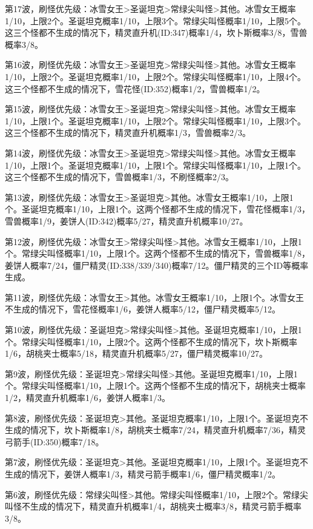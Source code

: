 第17波，刷怪优先级：冰雪女王>圣诞坦克>常绿尖叫怪>其他。冰雪女王概率1/10，上限2个。圣诞坦克概率1/10，上限3个。常绿尖叫怪概率1/10，上限5个。这三个怪都不生成的情况下，精灵直升机(ID:347)概率1/4，坎卜斯概率3/8，雪兽概率3/8。

第16波，刷怪优先级：冰雪女王>圣诞坦克>常绿尖叫怪>其他。冰雪女王概率1/10，上限2个。圣诞坦克概率1/10，上限2个。常绿尖叫怪概率1/10，上限4个。这三个怪都不生成的情况下，雪花怪(ID:352)概率1/2，雪兽概率1/2。

第15波，刷怪优先级：冰雪女王>圣诞坦克>常绿尖叫怪>其他。冰雪女王概率1/10，上限1个。圣诞坦克概率1/10，上限2个。常绿尖叫怪概率1/10，上限3个。这三个怪都不生成的情况下，精灵直升机概率1/3，雪兽概率2/3。

第14波，刷怪优先级：冰雪女王>圣诞坦克>常绿尖叫怪>其他。冰雪女王概率1/10，上限1个。圣诞坦克概率1/10，上限1个。常绿尖叫怪概率1/10，上限1个。这三个怪都不生成的情况下，雪兽概率1/3，不刷怪概率2/3。

第13波，刷怪优先级：冰雪女王>圣诞坦克>其他。冰雪女王概率1/10，上限1个。圣诞坦克概率1/10，上限1个。这两个怪都不生成的情况下，雪花怪概率1/3，雪兽概率1/9，姜饼人(ID:342)概率5/27，精灵直升机概率10/27。

第12波，刷怪优先级：冰雪女王>常绿尖叫怪>其他。冰雪女王概率1/10，上限1个。常绿尖叫怪概率1/10，上限1个。这两个怪都不生成的情况下，雪兽概率1/8，姜饼人概率7/24，僵尸精灵(ID:338/339/340)概率7/12。僵尸精灵的三个ID等概率生成。

第11波，刷怪优先级：冰雪女王>其他。冰雪女王概率1/10，上限1个。冰雪女王不生成的情况下，雪花怪概率1/6，姜饼人概率5/12，僵尸精灵概率5/12。

第10波，刷怪优先级：圣诞坦克>常绿尖叫怪>其他。圣诞坦克概率1/10，上限1个。常绿尖叫怪概率1/10，上限2个。这两个怪都不生成的情况下，坎卜斯概率1/6，胡桃夹士概率5/18，精灵直升机概率5/27，僵尸精灵概率10/27。

第9波，刷怪优先级：圣诞坦克>常绿尖叫怪>其他。圣诞坦克概率1/10，上限1个。常绿尖叫怪概率1/10，上限1个。这两个怪都不生成的情况下，胡桃夹士概率1/2，精灵直升机概率1/6，姜饼人概率1/3。

第8波，刷怪优先级：圣诞坦克>其他。圣诞坦克概率1/10，上限1个。圣诞坦克不生成的情况下，坎卜斯概率1/8，胡桃夹士概率7/24，精灵直升机概率7/36，精灵弓箭手(ID:350)概率7/18。

第7波，刷怪优先级：圣诞坦克>其他。圣诞坦克概率1/10，上限1个。圣诞坦克不生成的情况下，姜饼人概率1/3，精灵弓箭手概率1/6，僵尸精灵概率1/2。

第6波，刷怪优先级：常绿尖叫怪>其他。常绿尖叫怪概率1/10，上限2个。常绿尖叫怪不生成的情况下，精灵直升机概率1/4，胡桃夹士概率3/8，精灵弓箭手概率3/8。

